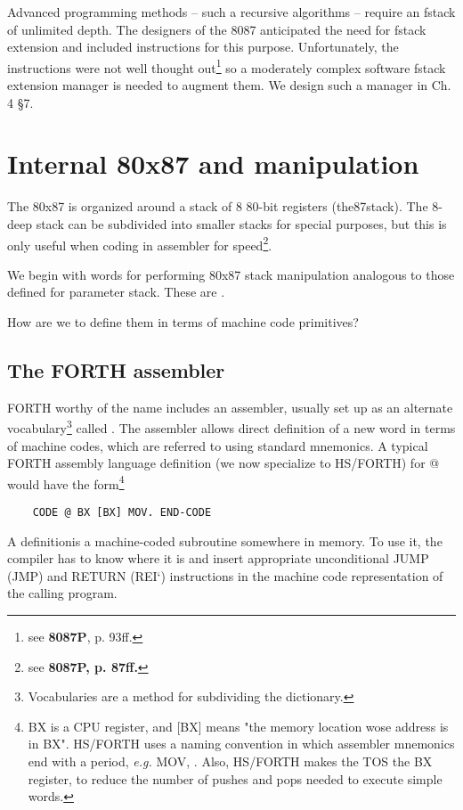 Advanced programming methods -- such a recursive algorithms -- require an fstack of unlimited depth. The designers of the 8087 anticipated the need for fstack extension and included instructions for this purpose. Unfortunately, the instructions were not well thought out\footnote{see \textbf{8087P}, p. 93ff.} so a moderately complex software fstack extension manager is needed to augment them. We design such a manager in Ch. 4 §7.

\section{Internal 80x87 and manipulation}

The 80x87 is organized around a stack of 8 80-bit registers (the87stack). The 8-deep stack can be subdivided into smaller stacks for special purposes, but this is only useful when coding in assembler for speed\footnote{see \textbf{8087P, p. 87ff.}}.

We begin with words for performing 80x87 stack manipulation analogous to those defined for parameter stack. These are  .

How are we to define them in terms of machine code primitives?

\subsection{The FORTH assembler}

 FORTH worthy of the name includes an assembler, usually set up as an alternate vocabulary\footnote{Vocabularies are a method for subdividing the dictionary.} called . The assembler allows direct definition of a new word in terms of machine codes, which are referred to using standard mnemonics. A typical FORTH assembly language definition (we now specialize to HS/FORTH) for @ would have the form\footnote{BX is a CPU register, and [BX] means "the memory location wose address is in BX". HS/FORTH uses a naming convention in which assembler mnemonics end with a period, \textit{e.g.} MOV, . Also, HS/FORTH makes the TOS the BX register, to reduce the number of pushes and pops needed to execute simple words.}

\begin{lstlisting}
    CODE @ BX [BX] MOV. END-CODE
\end{lstlisting}

A  definitionis a machine-coded subroutine somewhere in memory. To use it, the compiler has to know where it is and insert appropriate unconditional JUMP (JMP) and RETURN (REI‘) instructions in the machine code representation of the calling program.


